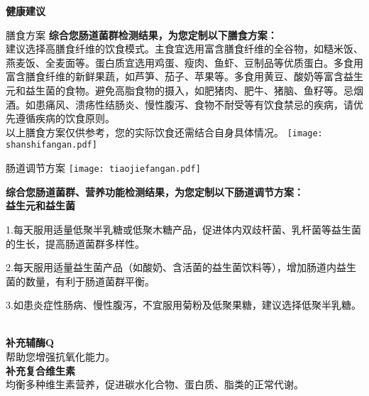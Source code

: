

\usepackage{graphicx}
\graphicspath{{cores/}}



\setlength{\arrayrulewidth}{1pt}
\fontsize{9.3pt}{11pt}\selectfont
\color{gray2}

\centerline{\bf\sanhao 健康建议}

\vspace*{0.5mm}

\begin{LRaside}[.20]{膳食方案}
{\bf *综合您肠道菌群检测结果，为您定制以下膳食方案：}\\
{\indent 建议选择高膳食纤维的饮食模式。主食宜选用富含膳食纤维的全谷物，如糙米饭、燕麦饭、全麦面等。蛋白质宜选用鸡蛋、瘦肉、鱼虾、豆制品等优质蛋白。多食用富含膳食纤维的新鲜果蔬，如芦笋、茄子、苹果等。多食用黄豆、酸奶等富含益生元和益生菌的食物。避免高脂食物的摄入，如肥猪肉、肥牛、猪脑、鱼籽等。忌烟酒。如患痛风、溃疡性结肠炎、慢性腹泻、食物不耐受等有饮食禁忌的疾病，请优先遵循疾病的饮食原则。}\\
\vspace*{0.5mm}
{\qihao *以上膳食方案仅供参考，您的实际饮食还需结合自身具体情况。}
\asidebreak %
\noindent
\texttt{[image: shanshifangan.pdf]}

\end{LRaside}


\begin{LRaside}[.70]{肠道调节方案}
\noindent
\texttt{[image: tiaojiefangan.pdf]}

\asidebreak %
{\bf *综合您肠道菌群、营养功能检测结果，为您定制以下肠道调节方案：}\\
{\bf 益生元和益生菌}\\{\indent 1.每天服用适量低聚半乳糖或低聚木糖产品，促进体内双歧杆菌、乳杆菌等益生菌的生长，提高肠道菌群多样性。

2.每天服用适量益生菌产品（如酸奶、含活菌的益生菌饮料等），增加肠道内益生菌的数量，有利于肠道菌群平衡。

3.如患炎症性肠病、慢性腹泻，不宜服用菊粉及低聚果糖，建议选择低聚半乳糖。}\\
{\bf 补充辅酶Q}\\{\indent 帮助您增强抗氧化能力。}\\
{\bf 补充复合维生素}\\{\indent 均衡多种维生素营养，促进碳水化合物、蛋白质、脂类的正常代谢。}\\
\end{LRaside}

